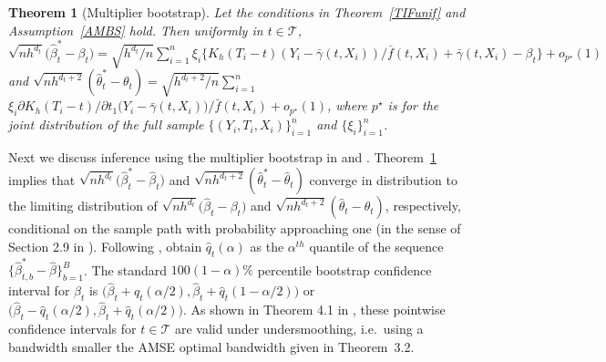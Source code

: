 \documentclass[lettersize, 12pt]{article}
\newtheorem{theorem}{Theorem}
\begin{document}
{\begin{theorem}[Multiplier bootstrap]
Let the conditions in Theorem~\ref{TIFunif} and Assumption~\ref{AMBS} hold.
Then uniformly in $t\in\mathcal{T}$,
$\sqrt{nh^{d_t}} \big(\hat \beta_t^\ast - \beta_t\big) = \sqrt{h^{d_t}/n} \sum_{i=1}^n \xi_i\big\{
K_h(T_i-t) (Y_i - \bar\gamma(t, X_i))/\bar f(t,X_i) +  \bar\gamma(t, X_i) - \beta_t  \big\}
+ o_{p^\star}(1)$
and
$\sqrt{nh^{d_t + 2}}( \hat \theta_t^\ast - \theta_{t} ) = \sqrt{h^{d_t+2}/n}  \sum_{i=1}^n$\\$ \xi_i \partial K_h(T_i - t)/\partial t_1 \big(Y_i - \bar\gamma(t, X_i)\big)/\bar f(t,X_i) + o_{p^\star}(1)$, 
where $p^{\star}$ is for the joint distribution of the full sample $\{(Y_i, T_i, X_i)\}_{i=1}^n$ and $\{\xi_i\}_{i=1}^n$.
\label{TMBS}
\end{theorem}

Next we discuss inference using the multiplier bootstrap in \cite{SUZ} and \cite{Fan}.
Theorem~\ref{TMBS} implies that $\sqrt{nh^{d_t}} \big(\hat \beta_t^\ast - \hat\beta_t\big)$
and $\sqrt{nh^{d_t + 2}}( \hat \theta_t^\ast - \hat\theta_{t} )$
converge in distribution to the limiting distribution of 
$\sqrt{nh^{d_t}} \big(\hat \beta_t - \beta_t\big)$
and $\sqrt{nh^{d_t + 2}}( \hat \theta_t - \theta_{t} )$, respectively, conditional on the sample path with probability approaching one (in the sense of Section 2.9 in \cite{VW96}).
Following \cite{SUZ}, obtain $\hat q_t(\alpha)$ as the $\alpha^{th}$ quantile of the sequence $\big\{\hat\beta_{t,b}^\ast-\hat\beta\big\}_{b=1}^B$.
The standard $100(1-\alpha)\%$ percentile bootstrap confidence interval for $\beta_t$ is $\big(\hat\beta_t+\hat q_t(\alpha/2), \hat\beta_t+\hat q_t(1-\alpha/2)\big)$
or $\big(\hat \beta_t -\hat q_t(\alpha/2), \hat \beta_t+\hat q_t(\alpha/2)\big)$.
As shown in Theorem 4.1 in \cite{SUZ}, these pointwise confidence intervals for $t\in\mathcal{T}$ are valid under undersmoothing, i.e.\ using a bandwidth smaller the AMSE optimal bandwidth given in Theorem~3.2.

}
\end{document}
